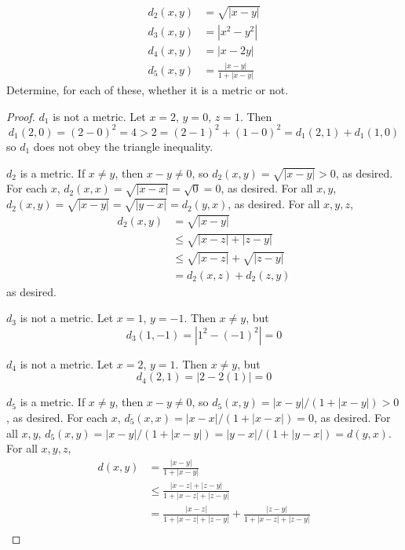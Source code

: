 \documentclass[../psets.tex]{subfiles}
\begin{document}
\begin{enumerate}[label={\textbf{\arabic*.}}]
\begin{align*}
        d_2(x,y) &= \sqrt{|x-y|}\\
        d_3(x,y) &= |x^2-y^2|\\
        d_4(x,y) &= |x-2y|\\
        d_5(x,y) &= \frac{|x-y|}{1+|x-y|}
    \end{align*}
    Determine, for each of these, whether it is a metric or not.
    \begin{proof}
        $d_1$ is not a metric. Let $x=2$, $y=0$, $z=1$. Then
        \begin{equation*}
            d_1(2,0) = (2-0)^2 = 4 > 2 = (2-1)^2+(1-0)^2 = d_1(2,1)+d_1(1,0)
        \end{equation*}
        so $d_1$ does not obey the triangle inequality.\par
        $d_2$ is a metric. If $x\neq y$, then $x-y\neq 0$, so $d_2(x,y)=\sqrt{|x-y|}>0$, as desired. For each $x$, $d_2(x,x)=\sqrt{|x-x|}=\sqrt{0}=0$, as desired. For all $x,y$, $d_2(x,y)=\sqrt{|x-y|}=\sqrt{|y-x|}=d_2(y,x)$, as desired. For all $x,y,z$,
        \begin{align*}
            d_2(x,y) &= \sqrt{|x-y|}\\
            &\leq \sqrt{|x-z|+|z-y|}\\
            &\leq \sqrt{|x-z|}+\sqrt{|z-y|}\\
            &= d_2(x,z)+d_2(z,y)
        \end{align*}
        as desired.\par
        $d_3$ is not a metric. Let $x=1$, $y=-1$. Then $x\neq y$, but
        \begin{equation*}
            d_3(1,-1) = |1^2-(-1)^2| = 0
        \end{equation*}\par
        $d_4$ is not a metric. Let $x=2$, $y=1$. Then $x\neq y$, but
        \begin{equation*}
            d_4(2,1) = |2-2(1)| = 0
        \end{equation*}\par
        $d_5$ is a metric. If $x\neq y$, then $x-y\neq 0$, so $d_5(x,y)=|x-y|/(1+|x-y|)>0$, as desired. For each $x$, $d_5(x,x)=|x-x|/(1+|x-x|)=0$, as desired. For all $x,y$, $d_5(x,y)=|x-y|/(1+|x-y|)=|y-x|/(1+|y-x|)=d(y,x)$. For all $x,y,z$,
        \begin{align*}
            d(x,y) &= \frac{|x-y|}{1+|x-y|}\\
            &\leq \frac{|x-z|+|z-y|}{1+|x-z|+|z-y|}\\
            &= \frac{|x-z|}{1+|x-z|+|z-y|}+\frac{|z-y|}{1+|x-z|+|z-y|}\\

\end{align*}
\end{proof}
\end{enumerate}
\end{document}
